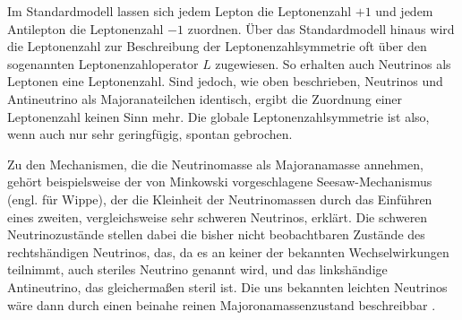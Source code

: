 Im Standardmodell lassen sich jedem Lepton die Leptonenzahl $+1$ und jedem Antilepton die Leptonenzahl $-1$ zuordnen. 
Über das Standardmodell hinaus wird die Leptonenzahl zur Beschreibung der Leptonenzahlsymmetrie oft über den sogenannten Leptonenzahloperator $L$ zugewiesen.
So erhalten auch Neutrinos als Leptonen eine Leptonenzahl.
Sind jedoch, wie oben beschrieben, Neutrinos und Antineutrino als Majoranateilchen identisch, ergibt die Zuordnung einer Leptonenzahl keinen Sinn mehr.
Die globale Leptonenzahlsymmetrie ist also, wenn auch nur sehr geringfügig, spontan gebrochen.

Zu den Mechanismen, die die Neutrinomasse als Majoranamasse annehmen, gehört beispielsweise der von Minkowski vorgeschlagene Seesaw-Mechanismus (engl. für Wippe), der die Kleinheit der Neutrinomassen durch das
Einführen eines zweiten, vergleichsweise sehr schweren Neutrinos, erklärt.
Die schweren Neutrinozustände stellen dabei die bisher nicht beobachtbaren Zustände des rechtshändigen Neutrinos, das, da es an keiner der bekannten Wechselwirkungen teilnimmt, auch steriles Neutrino genannt wird,
und das linkshändige Antineutrino, das gleichermaßen steril ist.
Die uns bekannten leichten Neutrinos wäre dann durch einen beinahe reinen Majoronamassenzustand beschreibbar \cite[Kap. 1.6.5]{kleingrot}.











